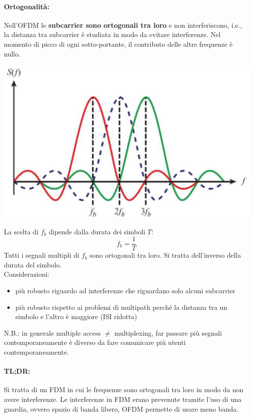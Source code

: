 \paragraph{Ortogonalità:} Nell'OFDM le \textbf{subcarrier sono ortogonali tra loro} e non interferiscono, i.e., la distanza tra subcarrier è studiata in modo da evitare interferenze. Nel momento di picco di ogni sotto-portante, il contributo delle altre frequenze è nullo.
\begin{center}
	\includegraphics[width=0.6\linewidth]{img/wireless/OFDM2}
\end{center}

La scelta di $f_b$ dipende dalla durata dei simboli $T$:
$$ f_b = \frac{1}{T}$$
Tutti i segnali multipli di $f_b$ sono ortogonali tra loro. Si tratta dell'inverso della durata del simbolo.\\

Considerazioni:
\begin{itemize}
	\item più robusto riguardo ad interferenze che riguardano solo alcuni subcarrier
	\item più robusto rispetto ai problemi di multipath perché la distanza tra un simbolo e l'altro è maggiore (ISI ridotta)
\end{itemize}

N.B.: in generale multiple access $\neq$ multiplexing, far passare più segnali contemporaneamente è diverso da fare comunicare più utenti contemporaneamente.\\

\paragraph{TL;DR: } Si tratta di un FDM in cui le frequenze sono ortogonali tra loro in modo da non avere interferenze. Le interferenze in FDM erano prevenute tramite l'uso di una guardia, ovvero spazio di banda libero, OFDM permette di usare meno banda.\\

